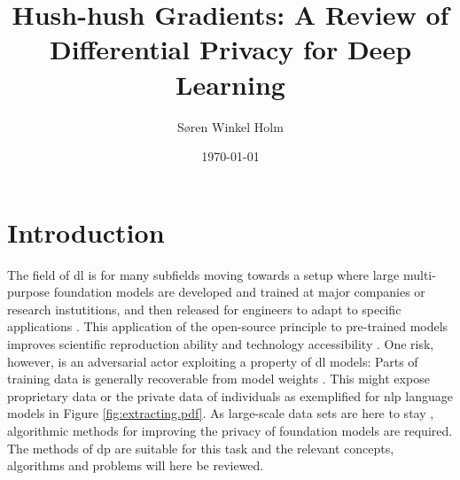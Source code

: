 \documentclass[12pt,fleqn,twocolumn]{article}
\title{Hush-hush Gradients: A Review of Differential Privacy for Deep Learning}
\author{Søren Winkel Holm}
\date{\today}
\begin{document}
\setlength{\headheight}{15pt}
\addtolength{\topmargin}{-2.5pt}

\maketitle
\thispagestyle{fancy}

\section*{Introduction}%
\label{sec:Introduction}
The field of \acrfull{dl} is for many subfields moving towards a setup where large multi-purpose foundation models are developed and trained at major companies or research instutitions, and then released for engineers to adapt to specific applications \cite[pp. 3]{bommasani2021oppurt}.
This application of the open-source principle to pre-trained models improves scientific reproduction ability \cite[pp. 3]{hartley2020dtool} and technology accessibility \cite[pp. 139]{bommasani2021oppurt}.
One risk, however, is an adversarial actor exploiting a property of \acrshort{dl} models: 
Parts of training data is generally recoverable from model weights \cite{nasr2019privacy, shokri2017membership}.
This might expose proprietary data or the private data of individuals as exemplified for \acrfull{nlp} language models in Figure \ref{fig:extracting.pdf}.
As large-scale data sets are here to stay \cite{sun2017unreasonable}, algorithmic methods for improving the privacy of foundation models are required.
The methods of \acrfull{dp} are suitable for this task and the relevant concepts, algorithms and problems will here be reviewed.
\end{document}

